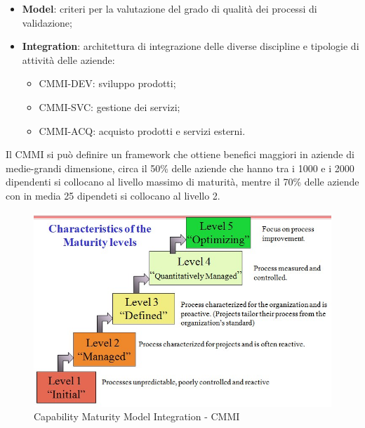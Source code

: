 \begin{itemize}
\begin{itemize}
	\end{itemize}
	\item \textbf{Model}: criteri per la valutazione del grado di qualità dei processi di validazione;
	\item \textbf{Integration}: architettura di integrazione delle diverse discipline e tipologie di attività delle aziende:
	\begin{itemize}
		\item CMMI-DEV: sviluppo prodotti;
		\item CMMI-SVC: gestione dei servizi;
		\item CMMI-ACQ: acquisto prodotti e servizi esterni.
	\end{itemize}	 
\end{itemize}
Il CMMI si può definire un framework che ottiene benefici maggiori in aziende di medie-grandi dimensione, circa il 50\% delle aziende che hanno tra i 1000 e i 2000 dipendenti si collocano al livello massimo di maturità, mentre il 70\% delle aziende con in media 25 dipendeti si collocano al livello 2.

\begin{figure}[H]
\centering
	\includegraphics[width=0.7\linewidth]{./images/Characteristics_of_the_Maturity_levels.jpg} 
	\caption{Capability Maturity Model Integration - CMMI}
	\label{cmmi}
\end{figure}


